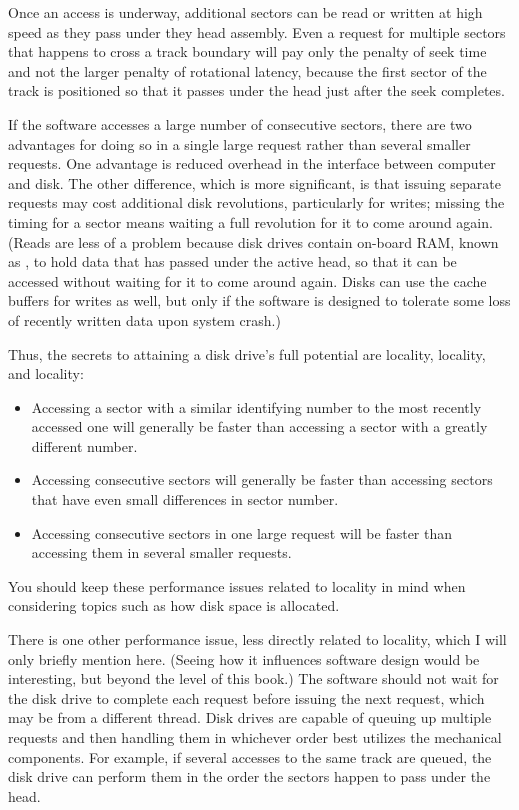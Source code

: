 Once an access is underway, additional sectors can be read or written
at high speed as they pass under they head assembly.  Even a request
for multiple sectors that happens to cross a track boundary will pay
only the penalty of seek time and not the larger penalty of rotational latency,
because the first sector of the track is positioned so that it passes under the head just
after the seek completes.

If the software accesses a large number of consecutive
sectors, there are two advantages for doing so in a single
large request rather than several smaller requests.  One advantage is reduced overhead in the interface
between computer and disk.  The other difference, which is more significant, is
that issuing separate requests may cost additional disk revolutions,
particularly for writes; missing the timing for a sector means waiting
a full revolution for it to come around again. (Reads are less of a
problem because disk drives contain on-board RAM, known as , to hold data that has
passed under the active head, so that it can be accessed without
waiting for it to come around again.  Disks can use the cache buffers for writes
as well, but only if the software is designed to tolerate some loss of
recently written data upon system crash.)

Thus, the secrets to attaining a disk drive's full potential are
locality, locality, and locality:
\begin{itemize}
\item
Accessing a sector with a similar identifying number to the most recently accessed one
will generally be faster than accessing a sector with a greatly
different number.
\item
Accessing consecutive sectors will generally be faster than accessing
sectors that have even small differences in sector number.
\item
Accessing consecutive sectors in one large request will be faster
than accessing them in several smaller requests.
\end{itemize}
You should keep these performance issues related to locality in mind when
considering topics such as how disk space is allocated.

There is one other performance issue, less directly related to
locality, which I will only briefly mention here. (Seeing how it
influences software design would be interesting, but beyond the level
of this book.)  The software should not wait for the disk drive to
complete each request before issuing the next request, which may be
from a different thread.  Disk drives are
capable of queuing up multiple requests and then handling them in whichever
order best utilizes the mechanical components.  For example, if
several accesses to the same track are queued, the disk drive can
perform them in the order the sectors happen to pass under the head.

